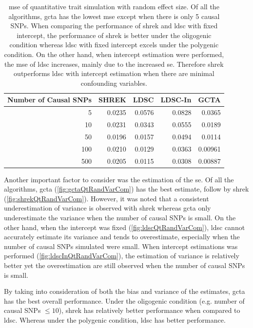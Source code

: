 	\begin{table}
		\centering
		\begin{tabular}{rrrrr}
			\toprule
			Number of Causal SNPs&	SHREK&	LDSC&	LDSC-In&	GCTA \\
			\midrule
			5	&	0.0235	&	0.0576	&	0.0828	&	0.0365\\
			10	&	0.0231	&	0.0343	&	0.0555	&	0.0189\\
			50	&	0.0196	&	0.0157	&	0.0494	&	0.0114\\
			100	&	0.0210	&	0.0129	&	0.0363	&	0.00961\\
			500	&	0.0205	&	0.0115	&	0.0308	&	0.00887\\
			\bottomrule
		\end{tabular}
		\caption[MSE of Quantitative Trait Simulation with Random Effect Size]{
			\Gls{mse} of quantitative trait simulation with random effect size.
			Of all the algorithms, \gls{gcta} has the lowest \gls{mse} except when there is only 5 causal \glspl{SNP}.
			When comparing the performance of \gls{shrek} and \gls{ldsc} with fixed intercept, the performance of \gls{shrek} is better under the oligogenic condition whereas \gls{ldsc} with fixed intercept excels under the polygenic condition. 
			On the other hand, when intercept estimation were performed, the \gls{mse} of \gls{ldsc} increases, mainly due to the increased \gls{se}. 
			Therefore \gls{shrek} outperforms \gls{ldsc} with intercept estimation when there are minimal confounding variables.
		}
		\label{tab:mseQtRandom}
	\end{table}
		Another important factor to consider was the estimation of the \gls{se}. 
		Of all the algorithms, \gls{gcta} (\cref{fig:gctaQtRandVarCom}) has the best estimate, follow by \gls{shrek} (\cref{fig:shrekQtRandVarCom}).
		However, it was noted that a consistent underestimation of variance is observed with \gls{shrek} whereas \gls{gcta} only underestimate the variance when the number of causal \glspl{SNP} is small.
		On the other hand, when the intercept was fixed (\cref{fig:ldscQtRandVarCom}), \gls{ldsc} cannot accurately estimate its variance and tends to overestimate, especially when the number of causal \glspl{SNP} simulated were small. 
		When intercept estimations was performed (\cref{fig:ldscInQtRandVarCom}), the estimation of variance is relatively better yet the overestimation are still observed when the number of causal \glspl{SNP} is small. 
		
		By taking into consideration of both the bias and variance of the estimates, \gls{gcta} has the best overall performance. 
		Under the oligogenic condition (e.g. number of causal \glspl{SNP} $\le10$), \gls{shrek} has relatively better performance when compared to \gls{ldsc}.
		Whereas under the polygenic condition, \gls{ldsc} has better performance. 
		
